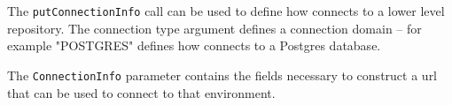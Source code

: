 The \verb+putConnectionInfo+ call can be used to define how \Rapture connects to a lower level repository. The connection type
argument defines a connection domain -- for example "POSTGRES" defines how \Rapture connects to a Postgres database.

The \verb+ConnectionInfo+ parameter contains the fields necessary to construct a url that can be used to connect to that environment.
